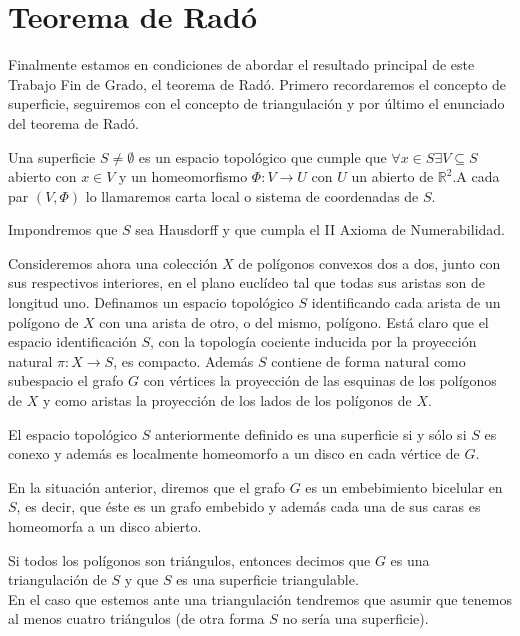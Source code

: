 \chapter{Teorema de Radó}

Finalmente estamos en condiciones de abordar el resultado principal de este Trabajo Fin de Grado, el teorema de Radó. Primero recordaremos  el concepto de superficie, seguiremos con el concepto de triangulación y por último el enunciado del teorema de Radó.

\begin{definition}
Una superficie $S \neq \emptyset$ es un espacio topológico que cumple que $\forall x \in S \exists V \subseteq S$ abierto con $x \in V$ y un homeomorfismo $\Phi : V \rightarrow U$ con $U$ un abierto de $\mathbb{R}^2$.A cada par $(V,\Phi)$ lo llamaremos carta local o sistema de coordenadas de $S$.
\end{definition}

\begin{remark}
Impondremos que $S$ sea Hausdorff y que cumpla el II Axioma de Numerabilidad.
\end{remark}

Consideremos ahora una colección $X$ de polígonos convexos dos a dos, junto con sus respectivos interiores, en el plano euclídeo tal que todas sus aristas son de longitud uno. Definamos un espacio topológico $S$ identificando cada arista de un polígono de $X$  con una  arista de otro, o del mismo, polígono. Está claro que el espacio identificación $S$, con la topología cociente inducida por la proyección natural $\pi\colon X\to S$,  es compacto. Además $S$ contiene de forma natural como subespacio el grafo $G$ con  vértices   la proyección de las esquinas de los polígonos de $X$ y como aristas la proyección de los lados de los polígonos de $X$.

\begin{lemma}
El espacio topológico $S$ anteriormente definido es una superficie si y sólo si $S$ es conexo y además es localmente homeomorfo a un disco en cada vértice de $G$.
\end{lemma}

\begin{definition}
En la situación anterior, diremos que el grafo $G$ es un embebimiento bicelular en $S$, es decir, que éste es un grafo embebido y además cada una de sus caras es homeomorfa a un disco abierto.
\end{definition}

\begin{definition}
Si todos los polígonos son triángulos, entonces decimos que $G$ es una triangulación de $S$ y que $S$ es una superficie triangulable.
\\
En el caso que estemos ante una triangulación tendremos que asumir que tenemos al menos cuatro triángulos (de otra forma $S$ no sería una superficie).
\end{definition}

